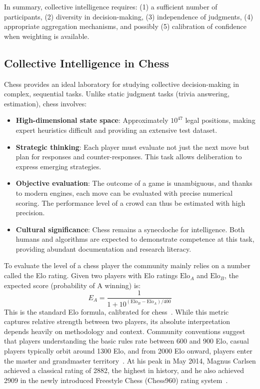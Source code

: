 \documentclass[sigconf]{aamas}
\begin{document}
In summary, collective intelligence requires:
(1) a sufficient number of participants,
(2) diversity in decision-making,
(3) independence of judgments,
(4) appropriate aggregation mechanisms, and possibly
(5) calibration of confidence when weighting is available.

\subsection{Collective Intelligence in Chess}

Chess provides an ideal laboratory for studying collective decision-making in complex, sequential tasks.
Unlike static judgment tasks (trivia answering, estimation), chess involves:
\begin{itemize}
  \item \textbf{High-dimensional state space}: Approximately \(10^{47}\) legal positions, making expert heuristics difficult and providing an extensive test dataset.
  \item \textbf{Strategic thinking}: Each player must evaluate not just the next move but plan for responses and counter-responses. This task allows deliberation to express emerging strategies.
  \item \textbf{Objective evaluation}: The outcome of a game is unambiguous, and thanks to modern engines, each move can be evaluated with precise numerical scoring. The performance level of a crowd can thus be estimated with high precision.
  \item \textbf{Cultural significance}: Chess remains a synecdoche for intelligence. Both humans and algorithms are expected to demonstrate competence at this task, providing abundant documentation and research literacy.
\end{itemize}

To evaluate the level of a chess player the community mainly relies on a number called the Elo rating.
Given two players with Elo ratings \(\text{Elo}_A\) and \(\text{Elo}_B\), the expected score (probability of A winning) is:
\begin{equation} \label{eqn:elo}
  E_A = \frac{1}{1 + 10^{(\text{Elo}_B - \text{Elo}_A) / 400}}
\end{equation}
This is the standard Elo formula, calibrated for chess~\cite{elo1978}.
While this metric captures relative strength between two players, its absolute interpretation depends heavily on methodology and context.
Community conventions suggest that players understanding the basic rules rate between 600 and 900 Elo, casual players typically orbit around 1300 Elo, and from 2000 Elo onward, players enter the master and grandmaster territory~\cite{elo1978}.
At his peak in May 2014, Magnus Carlsen achieved a classical rating of 2882, the highest in history, and he also achieved 2909 in the newly introduced Freestyle Chess (Chess960) rating system~\cite{carlsen2025}.
\end{document}
